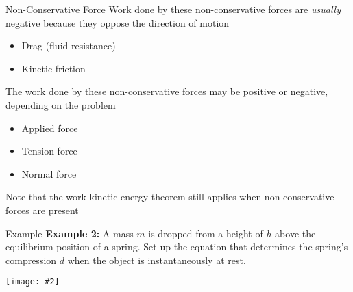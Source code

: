 \documentclass[12pt,compress,aspectratio=169]{beamer}
\newcommand{\pic}[2]{\texttt{[image: \#2]}}
\begin{document}
\begin{frame}{Non-Conservative Force}
  Work done by these non-conservative forces are \emph{usually} negative
  because they oppose the direction of motion
  \begin{itemize}
  \item Drag (fluid resistance)
  \item Kinetic friction
  \end{itemize}
  The work done by these non-conservative forces may be positive or negative,
  depending on the problem
  \begin{itemize}
  \item Applied force
  \item Tension force
  \item Normal force
  \end{itemize}
  Note that the work-kinetic energy theorem still applies when non-conservative
  forces are present
\end{frame}


\begin{frame}{Example}
  \textbf{Example 2:} A mass $m$ is dropped from a height of $h$ above the
  equilibrium position of a spring. Set up the equation that determines the
  spring's compression $d$ when the object is instantaneously at rest.
  \begin{center}
    \pic{.35}{spring-example1.png}
  \end{center}
\end{frame}


\end{document}
